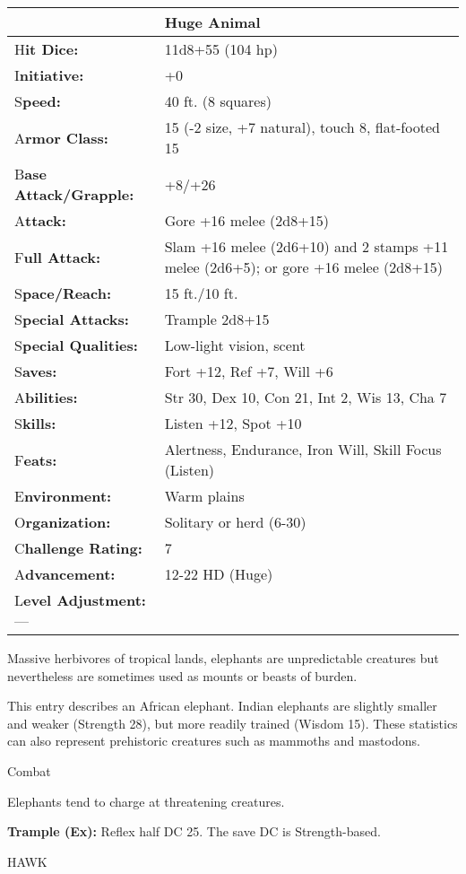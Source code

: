 \documentclass{article}
\begin{document}
\begin{tabular}{|>{\raggedright}p{91pt}|>{\raggedright}p{222pt}|}
\hline
  & Huge Animal\tabularnewline
\hline
H\textbf{it Dice:} & 11d8+55 (104 hp)\tabularnewline
\hline
I\textbf{nitiative:} & +0\tabularnewline
\hline
S\textbf{peed:} & 40 ft. (8 squares)\tabularnewline
\hline
A\textbf{rmor Class:} & 15 (-2 size, +7 natural), touch 8, flat-footed 15\tabularnewline
\hline
B\textbf{ase Attack/Grapple:} & +8/+26\tabularnewline
\hline
A\textbf{ttack:} & Gore +16 melee (2d8+15)\tabularnewline
\hline
F\textbf{ull Attack:} & Slam +16 melee (2d6+10) and 2 stamps +11 melee (2d6+5); 
or gore +16 melee (2d8+15)\tabularnewline
\hline
S\textbf{pace/Reach:} & 15 ft./10 ft.\tabularnewline
\hline
S\textbf{pecial Attacks:} & Trample 2d8+15\tabularnewline
\hline
S\textbf{pecial Qualities:} & Low-light vision, scent\tabularnewline
\hline
S\textbf{aves:} & Fort +12, Ref +7, Will +6\tabularnewline
\hline
A\textbf{bilities:} & Str 30, Dex 10, Con 21, Int 2, Wis 13, Cha 7\tabularnewline
\hline
S\textbf{kills:} & Listen +12, Spot +10\tabularnewline
\hline
F\textbf{eats:} & Alertness, Endurance, Iron Will, Skill Focus (Listen)\tabularnewline
\hline
E\textbf{nvironment:} & Warm plains\tabularnewline
\hline
O\textbf{rganization:} & Solitary or herd (6-30)\tabularnewline
\hline
C\textbf{hallenge Rating:} & 7\tabularnewline
\hline
A\textbf{dvancement:} & 12-22 HD (Huge)\tabularnewline
\hline
L\textbf{evel Adjustment:}--- & \tabularnewline
\hline
\end{tabular}

Massive herbivores of tropical lands, elephants are unpredictable creatures but 
nevertheless are sometimes used as mounts or beasts of burden.

This entry describes an African elephant. Indian elephants are slightly smaller 
and weaker (Strength 28), but more readily trained (Wisdom 15). These statistics 
can also represent prehistoric creatures such as mammoths and mastodons. 

Combat

Elephants tend to charge at threatening creatures. 

\textbf{Trample (Ex): }Reflex half DC 25. The save DC is Strength-based.

\vspace{12pt}
HAWK
\end{document}
